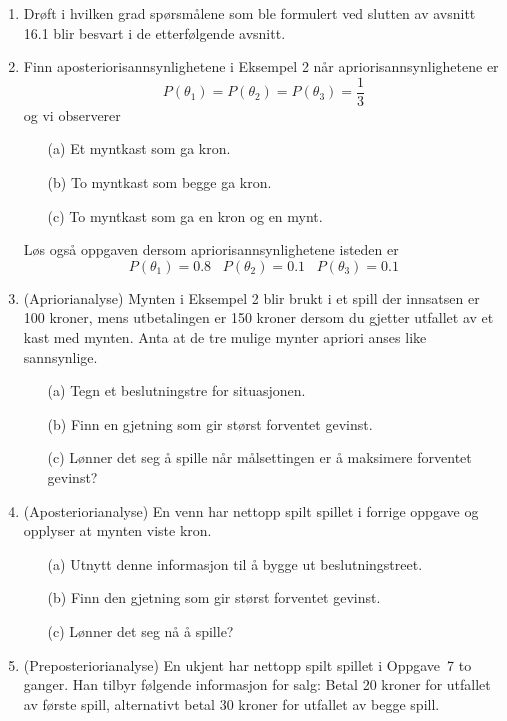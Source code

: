 {{\begin{enumerate}
\item
Drøft i hvilken grad spørsmålene som ble formulert ved slutten
av avsnitt 16.1 blir besvart i de etterfølgende avsnitt.

\item
Finn aposteriorisannsynlighetene i Eksempel 2 når apriorisannsynlighetene
er
\[  P({\theta}_1) = P({\theta}_2) = P({\theta}_3) = \frac{1}{3}  \]
og vi observerer
\begin{itemize}
\item[(a)] Et myntkast som ga kron.
\item[(b)] To myntkast som begge ga kron.
\item[(c)] To myntkast som ga en kron og en mynt.
\end{itemize}
Løs også oppgaven dersom apriorisannsynlighetene isteden er
\[ P({\theta}_1) = 0.8 \;\;\; P({\theta}_2) = 0.1 \;\;\; P({\theta}_3) = 0.1  \]


\item
(Apriorianalyse)  Mynten i Eksempel 2 blir brukt i et spill der innsatsen
er 100 kroner, mens utbetalingen er 150 kroner dersom du gjetter utfallet
av et kast med mynten.  Anta at de tre mulige mynter apriori anses like
sannsynlige. 

\begin{itemize}
\item[(a)] Tegn et beslutningstre for situasjonen.
\item[(b)] Finn en gjetning som gir størst forventet gevinst.
\item[(c)] Lønner det seg å spille når målsettingen er 
           å maksimere forventet gevinst?
\end{itemize}

\item
(Aposteriorianalyse)  En venn har nettopp spilt spillet i forrige oppgave
og opplyser at mynten viste kron.

\begin{itemize}
\item[(a)] Utnytt denne informasjon til å bygge ut beslutningstreet.
\item[(b)] Finn den gjetning som gir størst forventet gevinst.
\item[(c)] Lønner det seg nå å spille?
\end{itemize}

\item
(Preposteriorianalyse)  En ukjent har nettopp spilt spillet i Oppgave~7
to ganger.  Han tilbyr følgende informasjon for salg:  Betal 20 kroner 
for utfallet av første spill, alternativt betal 30 kroner for utfallet
av begge spill.


\end{enumerate}}}
